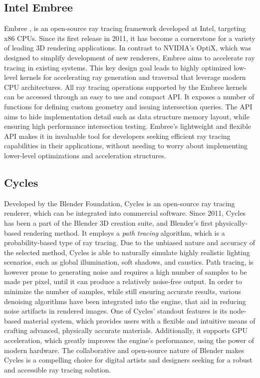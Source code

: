 \subsection{Intel Embree}

Embree \supercite{Wald2014}, is an open-source ray tracing framework developed at Intel, targeting x86 CPUs. 
Since its first release in 2011, it has become a cornerstone for a variety of leading 3D rendering applications. 
In contrast to NVIDIA's OptiX, which was designed to simplify development of new renderers, Embree aims to accelerate ray tracing in existing systems. 
This key design goal leads to highly optimized low-level kernels for accelerating ray generation and traversal that leverage modern CPU architectures.
All ray tracing operations supported by the Embree kernels can be accessed through an easy to use and compact API.
It exposes a number of functions for defining custom geometry and issuing intersection queries. 
The API aims to hide implementation detail such as data structure memory layout, while ensuring high performance intersection testing. 
Embree's lightweight and flexible API makes it in invaluable tool for developers seeking efficient ray tracing capabilities in their applications, without needing to worry about implementing lower-level optimizations and acceleration structures.

\subsection{Cycles}

Developed by the Blender Foundation, Cycles \supercite{Cycles} is an open-source ray tracing renderer, which can be integrated into commercial software. 
Since 2011, Cycles has been a part of the Blender 3D creation suite, and Blender's first physically-based rendering method.
It employs a \textit{path tracing} algorithm, which is a probability-based type of ray tracing.
Due to the unbiased nature and accuracy of the selected method, Cycles is able to naturally simulate highly realistic lighting scenarios, such as global illumination, soft shadows, and caustics.
Path tracing, is however prone to generating noise and requires a high number of samples to be made per pixel, until it can produce a relatively noise-free output.
In order to minimize the number of samples, while still ensuring accurate results, various denoising algorithms have been integrated into the engine, that aid in reducing noise artifacts in rendered images.
One of Cycles' standout features is its node-based material system, which provides users with a flexible and intuitive means of crafting advanced, physically accurate materials. 
Additionally, it supports GPU acceleration, which greatly improves the engine's performance, using the power of modern hardware.
The collaborative and open-source nature of Blender makes Cycles is a compelling choice for digital artists and designers seeking for a robust and accessible ray tracing solution.

